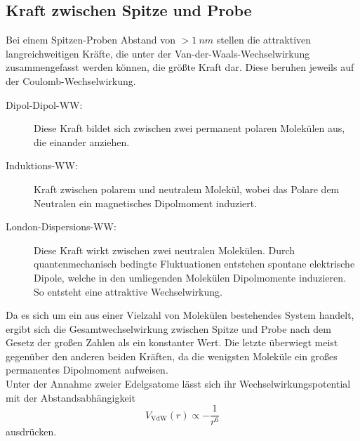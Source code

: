\subsection{Kraft zwischen Spitze und Probe}
    Bei einem Spitzen-Proben Abstand von $> \SI{1}{nm}$ stellen die attraktiven langreichweitigen Kräfte, die unter der Van-der-Waals-Wechselwirkung zusammengefasst werden können, die größte Kraft dar. Diese beruhen jeweils auf der Coulomb-Wechselwirkung.
    \hspace{3cm}
    \begin{description}
        \item[Dipol-Dipol-WW:]  Diese Kraft bildet sich zwischen zwei permanent polaren Molekülen aus, die einander anziehen.
        \item[Induktions-WW:]  Kraft zwischen polarem und neutralem Molekül, wobei das Polare dem Neutralen ein magnetisches Dipolmoment induziert.
        \item[London-Dispersions-WW:]  Diese Kraft wirkt zwischen zwei neutralen Molekülen. Durch quantenmechanisch bedingte Fluktuationen entstehen spontane elektrische Dipole, welche in den umliegenden Molekülen Dipolmomente induzieren. So entsteht eine attraktive Wechselwirkung.
    \end{description}
    Da es sich um ein aus einer Vielzahl von Molekülen bestehendes System handelt, ergibt sich die Gesamtwechselwirkung zwischen Spitze und Probe nach dem Gesetz der großen Zahlen als ein konstanter Wert.
    Die letzte überwiegt meist gegenüber den anderen beiden Kräften, da die wenigsten Moleküle ein großes permanentes Dipolmoment aufweisen. \\
    Unter der Annahme zweier Edelgsatome lässt sich ihr Wechselwirkungspotential mit der Abstandsabhängigkeit
    \begin{equation*}
        V_{\mathrm{VdW}}(r) \propto -\frac{1}{r^6}
    \end{equation*}
    ausdrücken.

